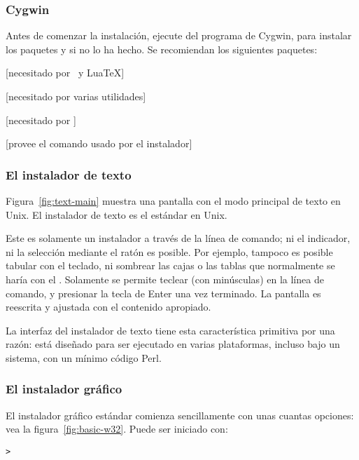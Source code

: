 \documentclass{article}
\begin{document}
\subsubsection{Cygwin}
\label{sec:cygwin}

Antes de comenzar la instalación, ejecute  del
programa de Cygwin, para instalar los paquetes  y
 si no lo ha hecho. Se recomiendan los siguientes
paquetes:
\begin{itemize*}
	\item {}[necesitado por \XeTeX\ y Lua\TeX]
	\item {} [necesitado por varias utilidades]
	\item {} [necesitado por ]
	\item {} [provee el comando  usado por el instalador]
\end{itemize*}

\subsubsection{El instalador de texto}

Figura~\ref{fig:text-main} muestra una pantalla con el modo principal
de texto en Unix. El instalador de texto es el estándar en Unix. 

Este es solamente un instalador a través de la línea de comando; ni el
indicador, ni la selección mediante el ratón es posible. Por ejemplo,
tampoco es posible tabular con el teclado, ni sombrear las cajas o las
tablas que normalmente se haría con el \GUI. Solamente se permite
teclear (con minúsculas) en la línea de comando, y presionar la tecla
de Enter una vez terminado. La pantalla es reescrita y ajustada con el
contenido apropiado. 

La interfaz del instalador de texto tiene esta
característica primitiva por una razón: está diseñado para
ser ejecutado en varias plataformas, incluso bajo un
sistema, con un mínimo código Perl. 

\subsubsection{El instalador gráfico}
\label{sec:graphical-inst}

El instalador gráfico estándar comienza sencillamente con
unas cuantas opciones: vea la figura~\ref{fig:basic-w32}.
Puede ser iniciado con:
\begin{alltt}
	> 
\end{alltt}
\end{document}
